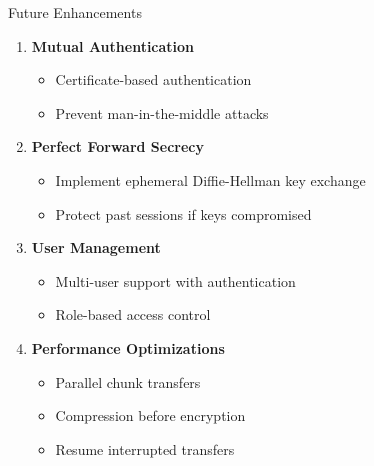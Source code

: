 \documentclass[aspectratio=169]{beamer}
\begin{document}
\begin{frame}{Future Enhancements}
\begin{enumerate}
    \item \textbf{Mutual Authentication}
    \begin{itemize}
        \item Certificate-based authentication
        \item Prevent man-in-the-middle attacks
    \end{itemize}
    
    \item \textbf{Perfect Forward Secrecy}
    \begin{itemize}
        \item Implement ephemeral Diffie-Hellman key exchange
        \item Protect past sessions if keys compromised
    \end{itemize}
    
    \item \textbf{User Management}
    \begin{itemize}
        \item Multi-user support with authentication
        \item Role-based access control
    \end{itemize}
    
    \item \textbf{Performance Optimizations}
    \begin{itemize}
        \item Parallel chunk transfers
        \item Compression before encryption
        \item Resume interrupted transfers
    \end{itemize}
\end{enumerate}
\end{frame}
\end{document}
